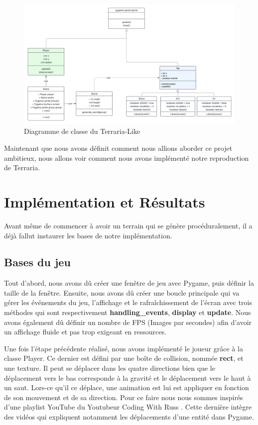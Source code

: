 \documentclass[12pt]{article}
\begin{document}
\begin{figure}[!h]
  \centering
  \includegraphics[width=\textwidth]{assets/UML_class.png}
  \caption{Diagramme de classe du Terraria-Like}
  \label{UML_class}
\end{figure}

Maintenant que nous avons définit comment nous allions aborder ce projet ambitieux, nous allons voir comment nous avons implémenté notre reproduction de Terraria.
\newpage
\section{Implémentation et Résultats}
\label{Implémentation}

Avant même de commencer à avoir un terrain qui se génère procéduralement, il a déjà fallut instaurer les bases de notre implémentation.

\subsection{Bases du jeu}

Tout d'abord, nous avons dû créer une fenêtre de jeu avec Pygame, puis définir la taille de la fenêtre. Ensuite, nous avons dû créer une boucle principale qui va gérer les événements du jeu, l'affichage et le rafraîchissement de l'écran avec trois méthodes qui sont respectivement \textbf{handling\_events}, \textbf{display} et \textbf{update}. Nous avons également dû définir un nombre de FPS (Images par secondes) afin d'avoir un affichage fluide et pas trop exigeant en ressources.\par
Une fois l'étape précédente réalisé, nous avons implémenté le joueur grâce à la classe Player. Ce dernier est défini par une boîte de collision, nommée \textbf{rect}, et une texture. Il peut se déplacer dans les quatre directions bien que le déplacement vers le bas corresponde à la gravité et le déplacement vers le haut à un saut. Lors-ce qu'il ce déplace, une animation est lui est appliquer en fonction de son mouvement et de sa direction. Pour ce faire nous nous sommes inspirés d'une playlist YouTube du Youtubeur Coding With Russ \cite{codingwithruss-playlist}. Cette dernière intègre des vidéos qui expliquent notamment les déplacements d'une entité dans Pygame.\par
\end{document}
